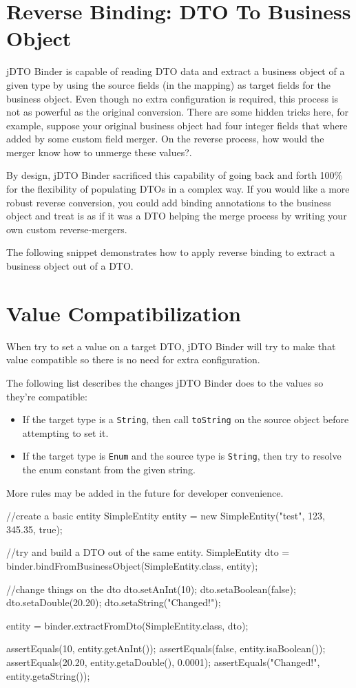 \documentclass[11pt]{article}
\newcommand{\JDTO}{jDTO Binder\xspace}
\begin{document}
\section{Reverse Binding: DTO To Business Object}

\JDTO is capable of reading DTO data and extract a business object of a given type by using the source fields (in the mapping) as target fields for the business object. Even though no extra configuration is required, this process is not as powerful as the original conversion. There are some hidden tricks here, for example, suppose your original business object had four integer fields that where added by some custom field merger. On the reverse process, how would the merger know how to unmerge these values?. 

By design, \JDTO sacrificed this capability of going back and forth 100\% for the flexibility of populating DTOs in a complex way. If you would like a more robust reverse conversion, you could add binding annotations to the business object and treat is as if it was a DTO helping the merge process by writing your own custom reverse-mergers.

The following snippet demonstrates how to apply reverse binding to extract a business object out of a DTO.

\section{Value Compatibilization}

When try to set a value on a target DTO, \JDTO will try to make that value compatible so there is no need for extra configuration.

The following list describes the changes \JDTO does to the values so they're compatible:

\begin{itemize}
\item If the target type is a \texttt{String}, then call \texttt{toString} on the source object before attempting to set it.
\item If the target type is \texttt{Enum} and the source type is \texttt{String}, then try to resolve the enum constant from the given string. 
\end{itemize}

More rules may be added in the future for developer convenience.

\begin{java}
//create a basic entity
SimpleEntity entity = new SimpleEntity("test", 123, 345.35, true);

//try and build a DTO out of the same entity.
SimpleEntity dto = 
    binder.bindFromBusinessObject(SimpleEntity.class, entity);

//change things on the dto
dto.setAnInt(10);
dto.setaBoolean(false);
dto.setaDouble(20.20);
dto.setaString("Changed!");

entity = binder.extractFromDto(SimpleEntity.class, dto);


assertEquals(10, entity.getAnInt());
assertEquals(false, entity.isaBoolean());
assertEquals(20.20, entity.getaDouble(), 0.0001);
assertEquals("Changed!", entity.getaString());
\end{java}
\end{document}
